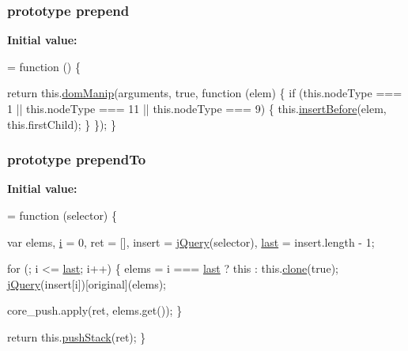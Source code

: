 \subsubsection[{\texorpdfstring{prepend}{prepend}}]{ {\bf prototype} prepend}\hypertarget{jquery-2_82_81-vsdoc_8js_a2d1a98145e139b1aea1d95967466b151}{}\label{jquery-2_82_81-vsdoc_8js_a2d1a98145e139b1aea1d95967466b151}
{\bfseries Initial value\+:}
\begin{DoxyCode}
= \textcolor{keyword}{function} () \{
        

        \textcolor{keywordflow}{return} this.\hyperlink{jquery-2_82_81-vsdoc_8js_a00a63bd312ef048290dc1755ccb8bae4}{domManip}(arguments, \textcolor{keyword}{true}, \textcolor{keyword}{function} (elem) \{
            \textcolor{keywordflow}{if} (this.nodeType === 1 || this.nodeType === 11 || this.nodeType === 9) \{
                this.\hyperlink{jquery-2_82_81-vsdoc_8js_a5501f909e772d4b753879c11efe9b64f}{insertBefore}(elem, this.firstChild);
            \}
        \});
    \}
\end{DoxyCode}
\subsubsection[{\texorpdfstring{prepend\+To}{prependTo}}]{ {\bf prototype} prepend\+To}\hypertarget{jquery-2_82_81-vsdoc_8js_a404bd77bf3be52acce1d4892d05c2c83}{}\label{jquery-2_82_81-vsdoc_8js_a404bd77bf3be52acce1d4892d05c2c83}
{\bfseries Initial value\+:}
\begin{DoxyCode}
= \textcolor{keyword}{function} (selector) \{
        

        var elems,
            \hyperlink{geolocation-marker_8js_a0325b7ce0988782a8032e720ef3aa411}{i} = 0,
            ret = [],
            insert = \hyperlink{jquery-2_82_81-vsdoc_8js_add5237586d970a38a81f990e8eb28c6c}{jQuery}(selector),
            \hyperlink{jquery-2_82_81-vsdoc_8js_a5a9684d230de11a6ec3029bcce128977}{last} = insert.length - 1;

        \textcolor{keywordflow}{for} (; i <= \hyperlink{jquery-2_82_81-vsdoc_8js_a5a9684d230de11a6ec3029bcce128977}{last}; i++) \{
            elems = i === \hyperlink{jquery-2_82_81-vsdoc_8js_a5a9684d230de11a6ec3029bcce128977}{last} ? \textcolor{keyword}{this} : this.\hyperlink{jquery-2_82_81-vsdoc_8js_a7d74ce76585989b4b6e2d506577e13ad}{clone}(\textcolor{keyword}{true});
            \hyperlink{jquery-2_82_81-vsdoc_8js_add5237586d970a38a81f990e8eb28c6c}{jQuery}(insert[i])[original](elems);

            
            core\_push.apply(ret, elems.get());
        \}

        \textcolor{keywordflow}{return} this.\hyperlink{jquery-2_82_81-vsdoc_8js_afc3a7db1ef2b526338c06c07cecccd44}{pushStack}(ret);
    \}
\end{DoxyCode}
